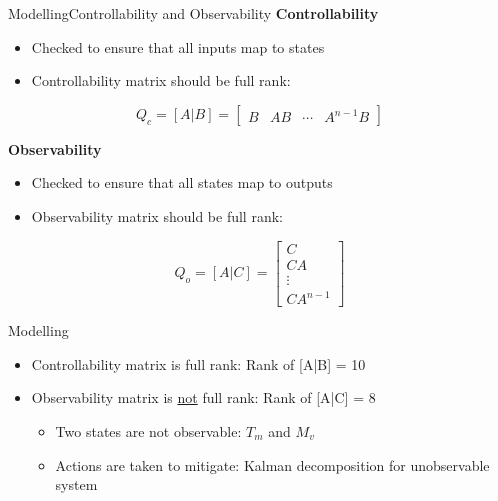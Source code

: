 
\begin{frame}{Modelling}{Controllability and Observability}
	\textbf{Controllability}
	\begin{itemize}
		\item Checked to ensure that all inputs map to states
		\item Controllability matrix should be full rank:
	\end{itemize}
	\begin{equation} \label{eq:ctrb}
		Q_c = [A|B] = \begin{bmatrix}  B & AB & \cdots & A^{n-1}B  \end{bmatrix}
	\end{equation}

	\textbf{Observability}
	\begin{itemize}
		\item Checked to ensure that all states map to outputs
		\item Observability matrix should be full rank:
	\end{itemize}
	\begin{equation}
		Q_o = [A|C] = \begin{bmatrix}
			C \\ CA \\ \vdots \\ CA^{n-1}
		\end{bmatrix}
	\end{equation}
\end{frame}




\begin{frame}{Modelling}{}
	\begin{itemize}
		\item Controllability matrix is full rank: Rank of [A|B] = 10
		\item Observability matrix is \underline{not} full rank: Rank of [A|C] = 8
			\begin{itemize}
				\item Two states are not observable: $T_m$ and $M_v$
				\item Actions are taken to mitigate: Kalman decomposition for unobservable system
			\end{itemize}
	\end{itemize}
\end{frame}




